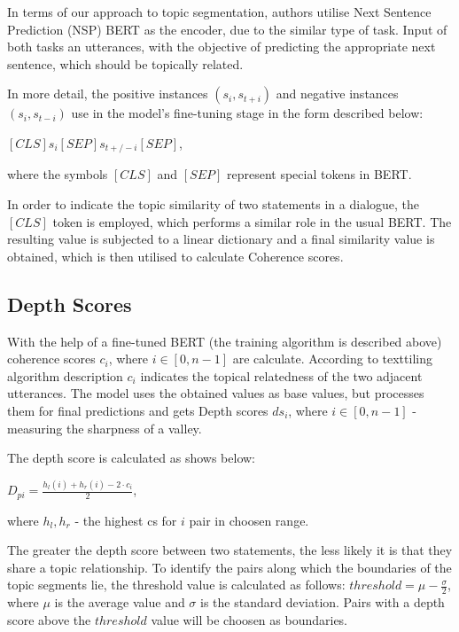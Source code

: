 \documentclass[PMI,VKR]{HSEUniversity}
\begin{document}
In terms of our approach to topic segmentation, authors utilise Next Sentence Prediction (NSP) BERT as the encoder, due to the similar type of task. 
Input of both tasks an utterances, with the objective of predicting the appropriate next sentence, which should be topically related. 

In more detail, the positive instances $(s_{i}, s_{t+i})$ and negative instances $(s_{i}, s_{t-i})$ use in the model's fine-tuning stage in the form described below: 
\begin{center}
    $[CLS] s_{i} [SEP] s_{t+/-i} [SEP]$,
\end{center}
where the symbols $[CLS]$ and $[SEP]$ represent special tokens in BERT. 

In order to indicate the topic similarity of two statements in a dialogue, the $[CLS]$ token is employed, which performs a similar role in the usual BERT. 
The resulting value is subjected to a linear dictionary and a final similarity value is obtained, which is then utilised to calculate Coherence scores.

\subsection{Depth Scores}

With the help of a fine-tuned BERT (the training algorithm is described above) coherence scores $c_i$, where $i \in [0, n - 1]$ are calculate. According to texttiling algorithm description $c_i$ indicates the topical relatedness of the two adjacent utterances.
The model uses the obtained values as base values, but processes them for final predictions and gets Depth scores $ds_i$, where $i \in [0, n - 1]$  - measuring the sharpness of a valley.

The depth score is calculated as shows below: 
\begin{center}
    $D_{pi} = \frac{h_{l}(i) + h_{r}(i) - 2 \cdot c_{i}}{2}$,
\end{center}
where $h_{l}, h_{r}$ - the highest cs for $i$ pair in choosen range.

The greater the depth score between two statements, the less likely it is that they share a topic relationship. 
To identify the pairs along which the boundaries of the topic segments lie, the threshold value is calculated as follows: $threshold = \mu - \frac{\sigma}{2}$, where $\mu$ is the average value and $\sigma$ is the standard deviation. Pairs with a depth score above the $threshold$ value will be choosen as boundaries.
\end{document}

